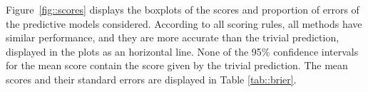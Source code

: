 \documentclass[journal,article,accept,moreauthors,pdftex,12pt,a4paper]{mdpi}
\begin{document}






    Figure~\ref{fig::scores} displays the boxplots of the scores and proportion of errors of the predictive models considered.
    According to all scoring rules, all methods have similar performance, and they are more accurate than the trivial prediction, displayed in the plots
    as an horizontal line. None of the 95\% confidence intervals for the mean score contain the score given by the trivial prediction. The mean scores and their standard errors are displayed
    in Table \ref{tab::brier}.
\end{document}
